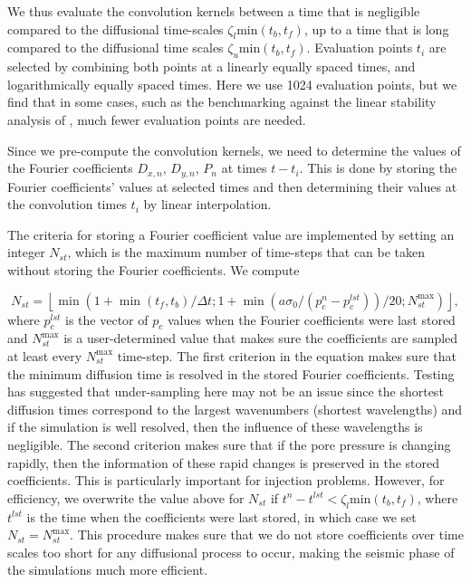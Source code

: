 \documentclass[draft]{agujournal2019}
\begin{document}
We thus evaluate the convolution kernels between a time that is negligible compared to the diffusional time-scales $\zeta_l \text{min} (t_b, t_f)$, up to a time that is long compared to the diffusional time scales $\zeta_u \text{min} (t_b, t_f)$. Evaluation points $t_i$ are selected by combining both points at a linearly equally spaced times, and logarithmically equally spaced times. Here we use 1024 evaluation points, but we find that in some cases, such as the benchmarking against the linear stability analysis of , much fewer evaluation points are needed.

Since we pre-compute the convolution kernels, we need to determine the values of the Fourier coefficients $D_{x,n}$, $D_{y,n}$, $P_{n}$ at times $t-t_i$. This is done by storing the Fourier coefficients' values at selected times and then determining their values at the convolution times $t_i$ by linear interpolation. 

The criteria for storing a Fourier coefficient value are implemented by setting an integer $N_{st}$, which is the maximum number of time-steps that can be taken without storing the Fourier coefficients. We compute 

\begin{equation}
   N_{st} = \left \lfloor \min ( 1 + \min(t_f,t_b)/ \Delta t ; 1 + \min(a  \sigma_0 / (p_c^n - p_c^{lst} ) )/20;  N_{st}^{\max}  ) \right \rfloor,
\end{equation}
where $p_c^{lst}$ is the vector of $p_c$ values when the Fourier coefficients were last stored and  $N_{st}^{\max}$ is a user-determined value that makes sure the coefficients are sampled at least every $N_{st}^{\max}$ time-step. The first criterion in the equation makes sure that the minimum diffusion time is resolved in the stored Fourier coefficients. Testing has suggested that under-sampling here may not be an issue since the shortest diffusion times correspond to the largest wavenumbers (shortest wavelengths) and if the simulation is well resolved, then the influence of these wavelengths is negligible. The second criterion makes sure that if the pore pressure is changing rapidly, then the information of these rapid changes is preserved in the stored coefficients. This is particularly important for injection problems. However, for efficiency, we overwrite the value above for $N_{st}$ if $t^n - t^{lst} < \zeta_l \text{min} (t_b, t_f)$, where $t^{lst}$ is the time when the coefficients were last stored, in which case we set $N_{st} = N_{st}^{\max}$. This procedure makes sure that we do not store coefficients over time scales too short for any diffusional process to occur, making the seismic phase of the simulations much more efficient. 
\end{document}

